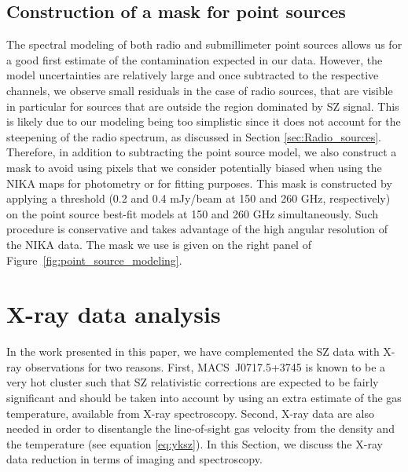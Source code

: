 \documentclass[twocolumn,traditabstract]{aa}
\begin{document}
\subsection{Construction of a mask for point sources}\label{sec:Construction_of_a_mask_for_point_sources}
The spectral modeling of both radio and submillimeter point sources allows us for a good first estimate of the contamination expected in our data. However, the model uncertainties are relatively large and once subtracted to the respective channels, we observe small residuals in the case of radio sources, that are visible in particular for sources that are outside the region dominated by SZ signal. This is likely due to our modeling being too simplistic since it does not account for the steepening of the radio spectrum, as discussed in Section \ref{sec:Radio_sources}. Therefore, in addition to subtracting the point source model, we also construct a mask to avoid using pixels that we consider potentially biased when using the NIKA maps for photometry or for fitting purposes. This mask is constructed by applying a threshold (0.2 and 0.4 mJy/beam at 150 and 260 GHz, respectively) on the point source best-fit models at 150 and 260 GHz simultaneously. Such procedure is conservative and takes advantage of the high angular resolution of the NIKA data. The mask we use is given on the right panel of Figure~\ref{fig:point_source_modeling}.

\section{X-ray data analysis}\label{sec:X_ray_data_reduction}
In the work presented in this paper, we have complemented the SZ data with X-ray observations for two reasons. First, \mbox{MACS~J0717.5+3745} is known to be a very hot cluster \citep{Ma2009} such that SZ relativistic corrections are expected to be fairly significant and should be taken into account by using an extra estimate of the gas temperature, available from X-ray spectroscopy. Second, X-ray data are also needed in order to disentangle the line-of-sight gas velocity from the density and the temperature (see equation \ref{eq:yksz}). In this Section, we discuss the X-ray data reduction in terms of imaging and spectroscopy.
\end{document}
